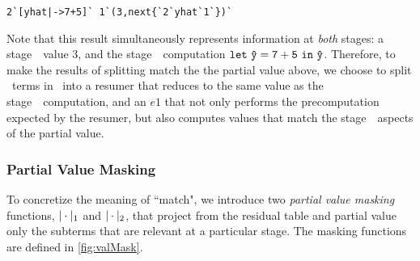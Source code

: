 \begin{lstlisting}
2`[yhat|->7+5]` 1`(3,next{`2`yhat`1`})`
\end{lstlisting}





Note that this result simultaneously represents information at {\em both} stages: 
a stage~\bbone\ value 3, and the stage~\bbtwo\ computation ${\tt let}~{\mathtt{\hat y}} = {\mathtt{7+5}}~{\tt in}~{\mathtt{\hat y}}$. 
Therefore, to make the results of splitting match the the partial value above, we choose to split \bbone\ terms in \lang\ into a resumer that reduces to the same value as the stage~\bbtwo\ computation, and an $e1$ that not only performs the precomputation expected by the resumer, but also computes values that match the stage~\bbone\ aspects of the partial value.




\subsubsection{Partial Value Masking}

To concretize the meaning of ``match", we introduce two {\em partial value masking} functions, $|\cdot|_{ 1}$ and $|\cdot|_{ 2}$, that project from the residual table and partial value only the subterms that are relevant at a particular stage.  The masking functions are defined in \ref{fig:valMask}. 

